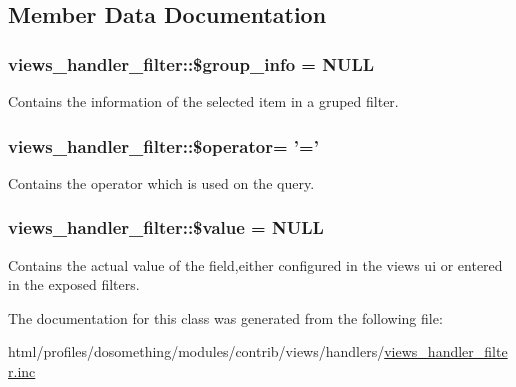 \subsection{Member Data Documentation}
\hypertarget{classviews__handler__filter_a0a4a6d9bb1f21fc42e93ddcd22c5b8f0}{
\subsubsection[{\$group\_\-info}]{\setlength{\rightskip}{0pt plus 5cm}views\_\-handler\_\-filter::\$group\_\-info = NULL}}
\label{classviews__handler__filter_a0a4a6d9bb1f21fc42e93ddcd22c5b8f0}
Contains the information of the selected item in a gruped filter. \hypertarget{classviews__handler__filter_af5712859dc7461dddc7ff84faf5d8006}{
\subsubsection[{\$operator= '='}]{\setlength{\rightskip}{0pt plus 5cm}views\_\-handler\_\-filter::\$operator= '='}}
\label{classviews__handler__filter_af5712859dc7461dddc7ff84faf5d8006}
Contains the operator which is used on the query. \hypertarget{classviews__handler__filter_ad5f0b79d107bf9647e7519ac75e1c027}{
\subsubsection[{\$value}]{\setlength{\rightskip}{0pt plus 5cm}views\_\-handler\_\-filter::\$value = NULL}}
\label{classviews__handler__filter_ad5f0b79d107bf9647e7519ac75e1c027}
Contains the actual value of the field,either configured in the views ui or entered in the exposed filters. 

The documentation for this class was generated from the following file:\begin{DoxyCompactItemize}
\item 
html/profiles/dosomething/modules/contrib/views/handlers/\hyperlink{views__handler__filter_8inc}{views\_\-handler\_\-filter.inc}\end{DoxyCompactItemize}
